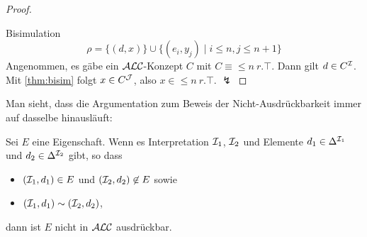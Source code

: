 \begin{tafel}[Beweisskizze]
\begin{proof}
 \begin{center}
 \end{center}
 Bisimulation
 \[
     \rho = \{ (d, x) \} \cup \{ (e_i, y_j) \mid i \leq n, j \leq n + 1 \}
 \]
 Angenommen, es gäbe ein $\mathcal{A}\mathcal{L}\mathcal{C}$-Konzept $C$ mit $C \equiv \leq n\ r.\top$. Dann gilt $d \in C^{\mathcal{I}}$. Mit \autoref{thm:bisim} folgt $x \in C^{\mathcal{J}}$, also $x \in \leq n\ r.\top$. $\lightning$
\end{proof}
\end{tafel}

Man sieht, dass die Argumentation zum Beweis der Nicht-Ausdrückbarkeit immer auf dasselbe hinausläuft:

\begin{theorem}
    \label{thm:alc-nicht-ausdruck}
Sei $E$ eine Eigenschaft. Wenn es Interpretation $\mathcal{I}_1$, $\mathcal{I}_2$
und Elemente $d_1 \in \Delta^{\mathcal{I}_1}$ und
$d_2 \in \Delta^{\mathcal{I}_2}$ gibt, so dass

\begin{itemize}
\item
  $\left( \MI_1,d_1 \right) \in E$ und
  $\left( \MI_2,d_2 \right) \not\in E$ sowie
\item
  $(\mathcal{I}_1,d_1) \sim (\mathcal{I}_2,d_2)$,
\end{itemize}

dann ist $E$ nicht in $\mathcal{A}\mathcal{L}\mathcal{C}$ ausdrückbar.
\end{theorem}

